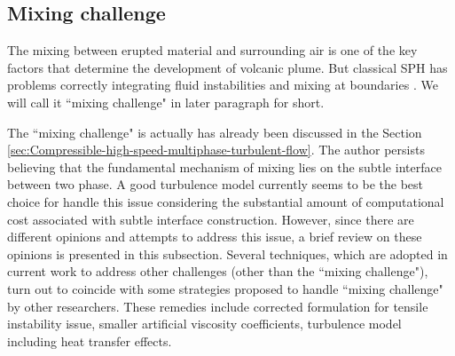 \subsection{Mixing challenge}

The mixing between erupted material and surrounding air is one of the key factors that determine the development of volcanic plume. 
But classical SPH has problems correctly integrating fluid instabilities and mixing at boundaries \citep{read2010resolving}. We will call it ``mixing challenge" in later paragraph for short.

The ``mixing challenge" is actually has already been discussed in the Section \ref{sec:Compressible-high-speed-multiphase-turbulent-flow}. The author persists believing that the fundamental mechanism of mixing lies on the subtle interface between two phase. A good turbulence model currently seems to be the best choice for handle this issue considering the substantial amount of computational cost associated with subtle interface construction. However, since there are different opinions and attempts to address this issue, a brief review on these opinions is presented in this subsection. Several techniques, which are adopted in current work to address other challenges (other than the ``mixing challenge"), turn out to coincide with some strategies proposed to handle ``mixing challenge" by other researchers. These remedies include corrected formulation for tensile instability issue, smaller artificial viscosity coefficients, turbulence model including heat transfer effects.

